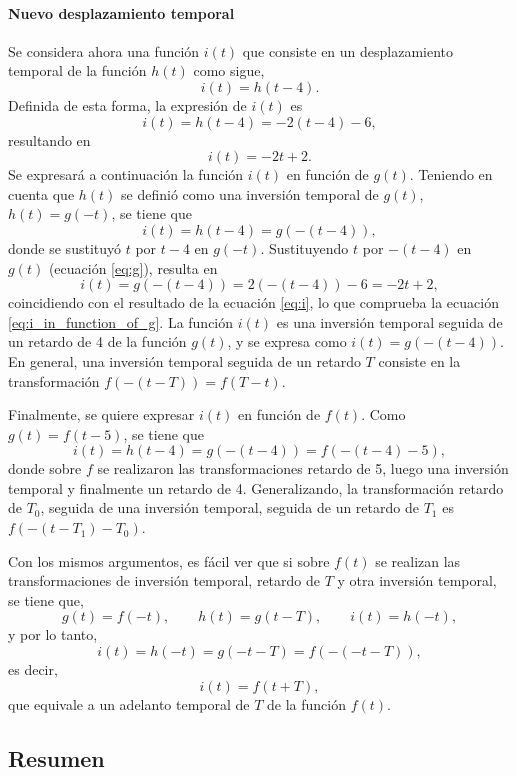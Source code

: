 \documentclass[a4paper]{article}
\begin{document}
\paragraph{Nuevo desplazamiento temporal} Se considera ahora una función \(i(t)\) que consiste en un desplazamiento temporal de la función \(h(t)\) como sigue,
\[
 i(t)=h(t-4).
\]
Definida de esta forma, la expresión de \(i(t)\) es
\[
 i(t)=h(t-4)=-2(t-4)-6,
\]
resultando en
\begin{equation}\label{eq:i}
 i(t)=-2t+2.
\end{equation}
Se expresará a continuación la función \(i(t)\) en función de \(g(t)\). Teniendo en cuenta que \(h(t)\) se definió como una inversión temporal de \(g(t)\), \(h(t)=g(-t)\), se tiene que
\begin{equation}\label{eq:i_in_function_of_g}
 i(t)=h(t-4)=g(-(t-4)),
\end{equation}
donde se sustituyó \(t\) por \(t-4\) en \(g(-t)\). Sustituyendo \(t\) por \(-(t-4)\) en \(g(t)\) (ecuación \ref{eq:g}), resulta en
\[
 i(t)=g(-(t-4))=2(-(t-4))-6=-2t+2, 
\]
coincidiendo con el resultado de la ecuación \ref{eq:i}, lo que comprueba la ecuación \ref{eq:i_in_function_of_g}. La función \(i(t)\) es una inversión temporal seguida de un retardo de 4 de la función \(g(t)\), y se expresa como \(i(t)=g(-(t-4))\). En general, una inversión temporal seguida de un retardo \(T\) consiste en la transformación \(f(-(t-T))=f(T-t)\).

Finalmente, se quiere expresar \(i(t)\) en función de \(f(t)\). Como \(g(t)=f(t-5)\), se tiene que
\[
 i(t)=h(t-4)=g(-(t-4))=f(-(t-4)-5),
\]
donde sobre \(f\) se realizaron las transformaciones retardo de 5, luego una inversión temporal y finalmente un retardo de 4. Generalizando, la transformación retardo de \(T_0\), seguida de una inversión temporal, seguida de un retardo de \(T_1\) es \(f(-(t-T_1)-T_0)\).

Con los mismos argumentos, es fácil ver que si sobre \(f(t)\) se realizan las transformaciones de inversión temporal, retardo de \(T\) y otra inversión temporal, se tiene que,
\[
 g(t)=f(-t),\qquad h(t)=g(t-T),\qquad i(t)=h(-t),
\]
y por lo tanto,
\[
 i(t)=h(-t)=g(-t-T)=f(-(-t-T)),
\]
es decir,
\[
 i(t)=f(t+T),
\]
que equivale a un adelanto temporal de \(T\) de la función \(f(t)\).

\subsection{Resumen}
\end{document}
